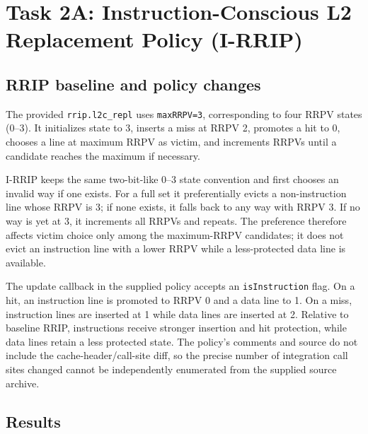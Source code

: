 \section{Task 2A: Instruction-Conscious L2 Replacement Policy (I-RRIP)}
\label{sec:task2a}
\subsection{RRIP baseline and policy changes}
The provided \texttt{rrip.l2c\_repl} uses \texttt{maxRRPV=3}, corresponding to four RRPV states (0--3). It initializes state to 3, inserts a miss at RRPV 2, promotes a hit to 0, chooses a line at maximum RRPV as victim, and increments RRPVs until a candidate reaches the maximum if necessary.

I-RRIP keeps the same two-bit-like 0--3 state convention and first chooses an invalid way if one exists. For a full set it preferentially evicts a non-instruction line whose RRPV is 3; if none exists, it falls back to any way with RRPV 3. If no way is yet at 3, it increments all RRPVs and repeats. The preference therefore affects victim choice only among the maximum-RRPV candidates; it does not evict an instruction line with a lower RRPV while a less-protected data line is available.

The update callback in the supplied policy accepts an \texttt{isInstruction} flag. On a hit, an instruction line is promoted to RRPV 0 and a data line to 1. On a miss, instruction lines are inserted at 1 while data lines are inserted at 2. Relative to baseline RRIP, instructions receive stronger insertion and hit protection, while data lines retain a less protected state. The policy's comments and source do not include the cache-header/call-site diff, so the precise number of integration call sites changed cannot be independently enumerated from the supplied source archive.

\subsection{Results}
\begin{table}[H]\centering\scriptsize
\caption{Task 2A results. Speedup is relative to RRIP for the same trace.}
\end{table}

